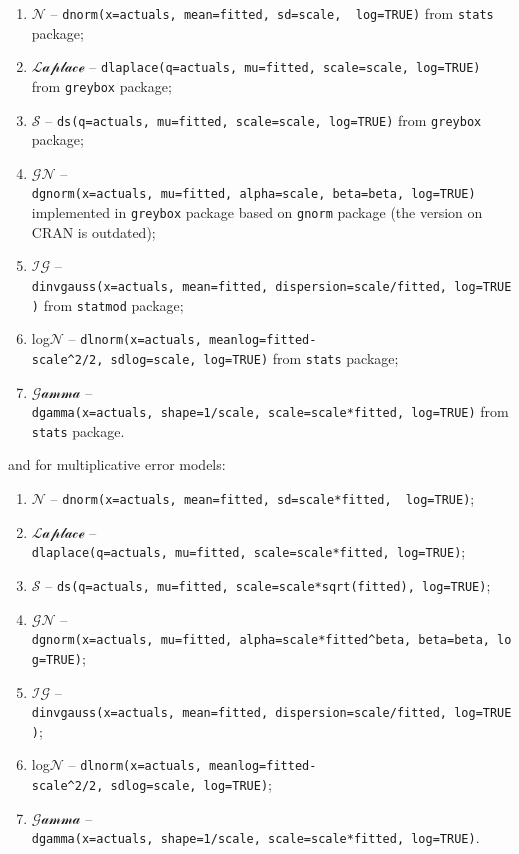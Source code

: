 \documentclass[]{book}
\providecommand{\tightlist}{%
  \setlength{\itemsep}{0pt}\setlength{\parskip}{0pt}}
\theoremstyle{definition}
\theoremstyle{definition}
\theoremstyle{definition}
\theoremstyle{definition}
\theoremstyle{remark}
\begin{document}
\begin{enumerate}
\def\labelenumi{\arabic{enumi}.}
\tightlist
\item
  \(\mathcal{N}\) -- \texttt{dnorm(x=actuals,\ mean=fitted,\ sd=scale,\ \ log=TRUE)} from \texttt{stats} package;
\item
  \(\mathcal{Laplace}\) -- \texttt{dlaplace(q=actuals,\ mu=fitted,\ scale=scale,\ log=TRUE)} from \texttt{greybox} package;
\item
  \(\mathcal{S}\) -- \texttt{ds(q=actuals,\ mu=fitted,\ scale=scale,\ log=TRUE)} from \texttt{greybox} package;
\item
  \(\mathcal{GN}\) -- \texttt{dgnorm(x=actuals,\ mu=fitted,\ alpha=scale,\ beta=beta,\ log=TRUE)} implemented in \texttt{greybox} package based on \texttt{gnorm} package (the version on CRAN is outdated);
\item
  \(\mathcal{IG}\) -- \texttt{dinvgauss(x=actuals,\ mean=fitted,\ dispersion=scale/fitted,\ log=TRUE)} from \texttt{statmod} package;
\item
  log\(\mathcal{N}\) -- \texttt{dlnorm(x=actuals,\ meanlog=fitted-scale\^{}2/2,\ sdlog=scale,\ log=TRUE)} from \texttt{stats} package;
\item
  \(\mathcal{Gamma}\) -- \texttt{dgamma(x=actuals,\ shape=1/scale,\ scale=scale*fitted,\ log=TRUE)} from \texttt{stats} package.
\end{enumerate}

and for multiplicative error models:

\begin{enumerate}
\def\labelenumi{\arabic{enumi}.}
\tightlist
\item
  \(\mathcal{N}\) -- \texttt{dnorm(x=actuals,\ mean=fitted,\ sd=scale*fitted,\ \ log=TRUE)};
\item
  \(\mathcal{Laplace}\) -- \texttt{dlaplace(q=actuals,\ mu=fitted,\ scale=scale*fitted,\ log=TRUE)};
\item
  \(\mathcal{S}\) -- \texttt{ds(q=actuals,\ mu=fitted,\ scale=scale*sqrt(fitted),\ log=TRUE)};
\item
  \(\mathcal{GN}\) -- \texttt{dgnorm(x=actuals,\ mu=fitted,\ alpha=scale*fitted\^{}beta,\ beta=beta,\ log=TRUE)};
\item
  \(\mathcal{IG}\) -- \texttt{dinvgauss(x=actuals,\ mean=fitted,\ dispersion=scale/fitted,\ log=TRUE)};
\item
  log\(\mathcal{N}\) -- \texttt{dlnorm(x=actuals,\ meanlog=fitted-scale\^{}2/2,\ sdlog=scale,\ log=TRUE)};
\item
  \(\mathcal{Gamma}\) -- \texttt{dgamma(x=actuals,\ shape=1/scale,\ scale=scale*fitted,\ log=TRUE)}.
\end{enumerate}
\end{document}
